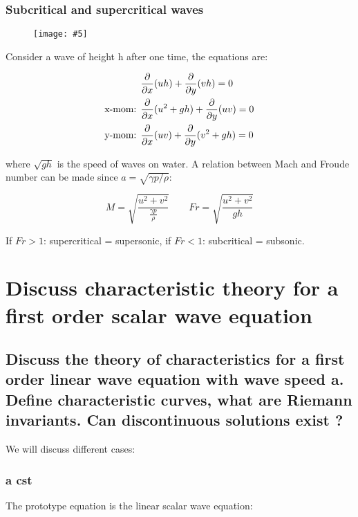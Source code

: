 \documentclass[british,french,11pt, a4paper, openany]{article}
\newcommand{\wrapfig}[6]{%
	\begin{wrapfigure}[#1]{#2}{#3cm}%
		\vspace{-5mm}%
		\texttt{[image: \#5]}%
		\captionof{figure}{}%
		\label{#6}%
	\end{wrapfigure}%
}
\begin{document}
\subsubsection{Subcritical and supercritical waves}
\wrapfig{5}{l}{3.5}{0.05}{ch8/8}{ch8/8}
Consider a wave of height h after one time, the equations are: 

\begin{equation}
\begin{aligned}
&\frac{\partial }{\partial x} (uh) + \frac{\partial}{\partial y} (vh) = 0\\
\mbox{x-mom: } &\frac{\partial}{\partial x } (u^2 + gh) + \frac{\partial}{\partial y} (uv) = 0\\
\mbox{y-mom: } &\frac{\partial}{\partial x } (uv) + \frac{\partial}{\partial y} (v^2 + gh) = 0
\end{aligned}
\end{equation}

where $\sqrt{gh}$ is the speed of waves on water. A relation between Mach and Froude number can be made since $a = \sqrt{\gamma p /\rho}$: 

\begin{equation}
M = \sqrt{\frac{u^2 + v^2}{\frac{\gamma p}{\rho}}} \qquad Fr = \sqrt{\frac{u^2 + v^2}{gh}}
\end{equation}

If $Fr > 1$: supercritical = supersonic, if $Fr < 1$: subcritical = subsonic. 



\section{Discuss characteristic theory for a first order scalar wave equation}
\subsection{Discuss the theory of characteristics for a first order linear wave equation with wave speed a. Define characteristic curves, what are Riemann invariants. Can discontinuous solutions exist ?}
We will discuss different cases:

\subsubsection{a cst}	
The prototype equation is the linear scalar wave equation: 
\end{document}
